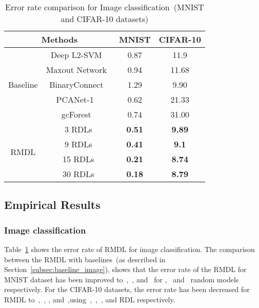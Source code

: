 \documentclass[sigconf, final]{acmart}
\begin{document}
\begin{table}[t]
\centering
\caption{Error rate comparison for Image classification~(MNIST and CIFAR-10 datasets)}
\label{ta:image}
\vspace{-0.1in}
\begin{tabular}{|c | c | c c|}
\hline
\multicolumn{2}{|c}{Methods}                                            & MNIST         & CIFAR-10     \\ \hline
\multirow{5}{*}{Baseline} & Deep L2-SVM~\cite{tang2013deep}                 & 0.87          & 11.9         \\ \cline{2-4} 
                          & Maxout Network~\cite{goodfellow2013maxout} & 0.94          & 11.68        \\ \cline{2-4} 
                          & BinaryConnect~\cite{courbariaux2015binaryconnect} & 1.29          & 9.90         \\ \cline{2-4} 
                          & PCANet-1 ~\cite{chan2015pcanet}                      & 0.62          & 21.33        \\ \cline{2-4} 
                          & gcForest~\cite{zhou2017deep}                    & 0.74          & 31.00        \\ \hline
\multirow{4}{*}{RMDL}     & 3 RDLs                              & \textbf{0.51}     & \textbf{9.89}    \\ \cline{2-4} 
                          & 9 RDLs                              & \textbf{0.41} & \textbf{9.1} \\ \cline{2-4} 
                          & 15 RDLs                             & \textbf{0.21} & \textbf{8.74}    \\ \cline{2-4}
                          \cline{2-4} 
                          & 30 RDLs                             & \textbf{0.18} & \textbf{8.79}    \\ \hline
\end{tabular}
\vspace{-0.1in}
\end{table}

\subsection{Empirical Results}\label{sec:Empirical_Results}
\subsubsection{Image classification}
Table~\ref{ta:image} shows the error rate of RMDL for image classification. The comparison between the RMDL with baselines~(as described in Section~\ref{subsec:baseline_image}), shows that the error rate of the RMDL for MNIST dataset has been improved to~,~, and~ for ,~ and~ random models respectively. For the CIFAR-10 datasets, the error rate has been decreased for RMDL to~,~, , and~,using~,~,~, and  RDL respectively.
\end{document}
